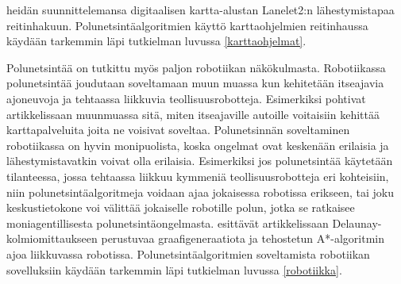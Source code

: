 heidän suunnittelemansa digitaalisen kartta-alustan Lanelet2:n 
lähestymistapaa reitinhakuun. Polunetsintäalgoritmien käyttö 
karttaohjelmien reitinhaussa käydään tarkemmin läpi tutkielman luvussa 
\ref{karttaohjelmat}. \par
	Polunetsintää on tutkittu myös paljon robotiikan näkökulmasta. 
Robotiikassa polunetsintää joudutaan soveltamaan muun muassa kun 
kehitetään itseajavia ajoneuvoja ja tehtaassa liikkuvia 
teollisuusrobotteja.\cite{arXivMAPF} Esimerkiksi \textcite{Lanelet2} 
pohtivat artikkelissaan muunmuassa sitä, miten itseajaville autoille 
voitaisiin kehittää karttapalveluita joita ne voisivat soveltaa. 
Polunetsinnän soveltaminen robotiikassa on hyvin monipuolista, koska 
ongelmat ovat keskenään erilaisia ja lähestymistavatkin voivat olla 
erilaisia. Esimerkiksi jos polunetsintää käytetään tilanteessa, jossa 
tehtaassa liikkuu kymmeniä teollisuusrobotteja eri kohteisiin, niin 
polunetsintäalgoritmeja voidaan ajaa jokaisessa robotissa erikseen, tai 
joku keskustietokone voi välittää jokaiselle robotille polun, jotka se 
ratkaisee moniagentillisesta polunetsintäongelmasta. 
\textcite{DelaunayVoronoiAStar} esittävät artikkelissaan 
Delaunay-kolmiomittaukseen perustuvaa graafigeneraatiota ja tehostetun 
A*-algoritmin ajoa liikkuvassa robotissa. Polunetsintäalgoritmien 
soveltamista robotiikan sovelluksiin käydään tarkemmin läpi tutkielman 
luvussa \ref{robotiikka}.
